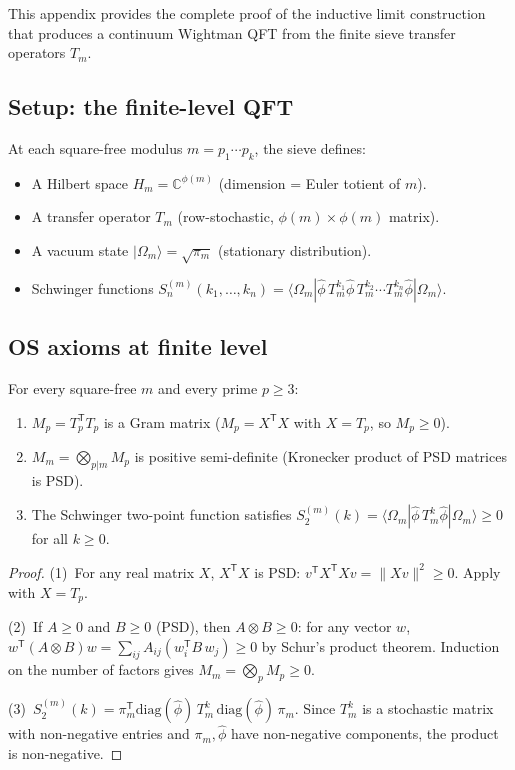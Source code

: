 \documentclass[12pt,a4paper]{article}
\begin{document}
This appendix provides the complete proof of the inductive limit
construction that produces a continuum Wightman QFT from the finite
sieve transfer operators $T_m$.

\subsection{Setup: the finite-level QFT}
\label{sec:os_setup}

At each square-free modulus $m = p_1 \cdots p_k$, the sieve defines:
\begin{itemize}[nosep]
\item A Hilbert space $H_m = \mathbb{C}^{\phi(m)}$
  (dimension = Euler totient of $m$).
\item A transfer operator $T_m$ (row-stochastic,
  $\phi(m) \times \phi(m)$ matrix).
\item A vacuum state $|\Omega_m\rangle = \sqrt{\pi_m}$
  (stationary distribution).
\item Schwinger functions $S_n^{(m)}(k_1, \ldots, k_n) =
  \langle\Omega_m| \hat\phi\, T_m^{k_1} \hat\phi\, T_m^{k_2}
  \cdots T_m^{k_n} \hat\phi |\Omega_m\rangle$.
\end{itemize}

\subsection{OS axioms at finite level}
\label{sec:os_finite}

\begin{theorem}
\label{thm:app_OS3}
For every square-free $m$ and every prime $p \geq 3$:
\begin{enumerate}[nosep]
\item $M_p = T_p^{\mathsf{T}} T_p$ is a Gram matrix
  ($M_p = X^{\mathsf{T}} X$ with $X = T_p$, so $M_p \geq 0$).
\item $M_m = \bigotimes_{p | m} M_p$ is positive semi-definite
  (Kronecker product of PSD matrices is PSD).
\item The Schwinger two-point function satisfies
  $S_2^{(m)}(k) = \langle\Omega_m| \hat\phi\, T_m^k \hat\phi
  |\Omega_m\rangle \geq 0$ for all $k \geq 0$.
\end{enumerate}
\begin{proof}
(1)~For any real matrix $X$, $X^{\mathsf{T}} X$ is PSD:
$v^{\mathsf{T}} X^{\mathsf{T}} X v = \|Xv\|^2 \geq 0$.
Apply with $X = T_p$.

(2)~If $A \geq 0$ and $B \geq 0$ (PSD), then $A \otimes B \geq 0$:
for any vector $w$, $w^{\mathsf{T}} (A \otimes B) w =
\sum_{ij} A_{ij} (w_i^{\mathsf{T}} B\, w_j) \geq 0$ by Schur's
product theorem.  Induction on the number of factors gives
$M_m = \bigotimes_p M_p \geq 0$.

(3)~$S_2^{(m)}(k) = \pi_m^{\mathsf{T}} \mathrm{diag}(\hat\phi)\,
T_m^k\, \mathrm{diag}(\hat\phi)\, \pi_m$.
Since $T_m^k$ is a stochastic matrix with non-negative entries and
$\pi_m, \hat\phi$ have non-negative components, the product is
non-negative.
\end{proof}
\end{theorem}
\end{document}
